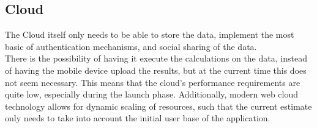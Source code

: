 \subsection{Cloud}
The Cloud itself only needs to be able to store the data, implement the most
basic of authentication mechanisms, and social sharing of the data. \\
There is the possibility of having it execute the calculations on the data, instead
of having the mobile device upload the results, but at the current time this does
not seem necessary. This means that the cloud's performance requirements are quite
low, especially during the launch phase. Additionally, modern web cloud technology
allows for dynamic scaling of resources, such that the current estimate only needs
to take into account the initial user base of the application.